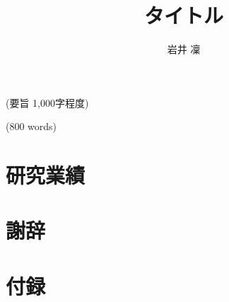 \documentclass[a4paper,11ptj]{ltjsreport}
\title{タイトル}
\author{岩井 凜}
\begin{document}
\maketitle

\begin{abstractja}
(要旨 1,000字程度)
\end{abstractja}

\begin{abstracten}
(800 words)
\end{abstracten}

\setcounter{tocdepth}{3}
\tableofcontents
\listoffigures
\listoftables

\clearpage
{}






\chapter*{研究業績}

\chapter*{謝辞}

\appendix
\chapter{付録}
\end{document}
